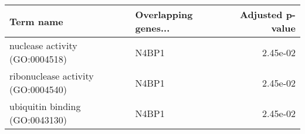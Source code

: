 \begin{tabular}{llr}
\toprule
                         Term name & Overlapping genes... &  Adjusted p-value \\
\midrule
    nuclease activity (GO:0004518) &                N4BP1 &          2.45e-02 \\
ribonuclease activity (GO:0004540) &                N4BP1 &          2.45e-02 \\
    ubiquitin binding (GO:0043130) &                N4BP1 &          2.45e-02 \\
\bottomrule
\end{tabular}
